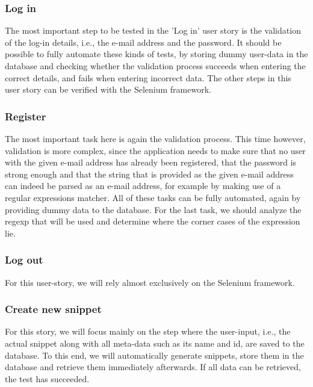 \documentclass {article}
\begin{document}
\subsubsection*{Log in}
The most important step to be tested in the 'Log in' user story is the validation of the log-in details, i.e., the e-mail address and the password.
It should be possible to fully automate these kinds of tests, by storing dummy user-data in the database and checking whether the validation process succeeds when entering the correct details, and fails when entering incorrect data.
The other steps in this user story can be verified with the Selenium framework.

\subsubsection*{Register}
The most important task here is again the validation process. This time however, validation is more complex, since the application needs to make sure that no user with the given e-mail address has already been registered, that the password is strong enough and that the string that is provided as the given e-mail address can indeed be parsed as an e-mail address, for example by making use of a regular expressions matcher.
All of these tasks can be fully automated, again by providing dummy data to the database. For the last task, we should analyze the regexp that will be used and determine where the corner cases of the expression lie.

\subsubsection*{Log out}
For this user-story, we will rely almost exclusively on the Selenium framework.

\subsubsection*{Create new snippet}
For this story, we will focus mainly on the step where the user-input, i.e., the actual snippet along with all meta-data such as its name and id, are saved to the database.
To this end, we will automatically generate snippets, store them in the database and retrieve them immediately afterwards. If all data can be retrieved, the test has succeeded.
\end{document}
